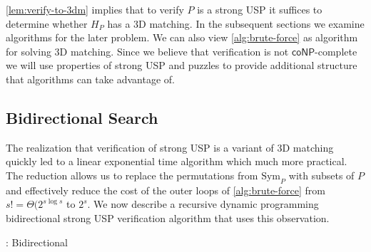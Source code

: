 \documentclass[11pt]{article}
\newcommand\Sym[1]{\ensuremath{\mathrm{Sym}_{#1}}}
\newcommand\coNP{\ensuremath{\mathsf{coNP}}}
\begin{document}
\autoref{lem:verify-to-3dm} implies that to verify $P$ is a strong USP
it suffices to determine whether $H_P$ has a 3D matching.  In the
subsequent sections we examine algorithms for the later problem.  We
can also view \autoref{alg:brute-force} as algorithm for solving 3D
matching.  Since we believe that verification is not \coNP-complete we
will use properties of strong USP and puzzles to provide additional
structure that algorithms can take advantage of.

\subsection{Bidirectional Search}

The realization that verification of strong USP is a variant of 3D
matching quickly led to a linear exponential time algorithm which much
more practical.  The reduction allows us to replace the permutations
from $\Sym{P}$ with subsets of $P$ and effectively reduce the cost of
the outer loops of \autoref{alg:brute-force} from $s! =
\Theta(2^{s\log s}$ to $2^s$.  We now describe a recursive dynamic
programming bidirectional strong USP verification algorithm that uses
this observation.

\begin{algorithm}
  \caption{: Bidirectional}
  \label{alg:bi}
\begin{algorithmic}[1]

     
    \Else {}
        \Else {} \EndIf
    \EndIf
  \EndIf    
   
      \EndIf
    \EndFor
  \EndFor
  \EndFunction
  
 
\end{algorithmic}
\end{algorithm}
\end{document}
